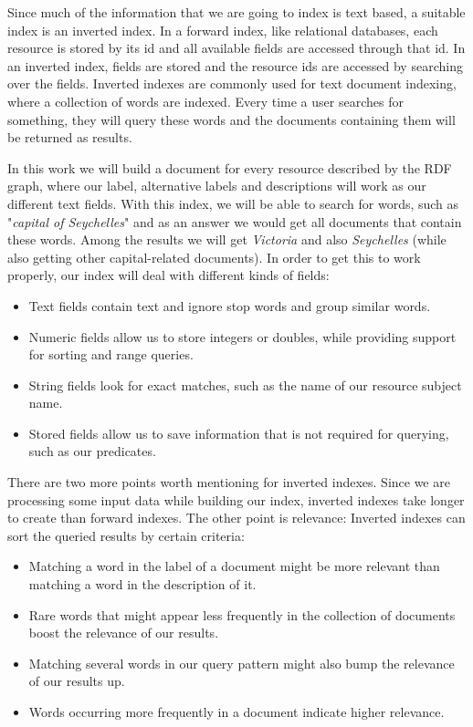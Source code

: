 Since much of the information that we are going to index is text based, a suitable index is an inverted index. In a forward index, like relational databases, each resource is stored by its id and all available fields are accessed through that id. In an inverted index, fields are stored and the resource ids are accessed by searching over the fields. Inverted indexes are commonly used for text document indexing, where a collection of words are indexed. Every time a user searches for something, they will query these words and the documents containing them will be returned as results.

In this work we will build a document for every resource described by the RDF graph, where our label, alternative labels and descriptions will work as our different text fields. With this index, we will be able to search for words, such as "\textit{capital of Seychelles}" and as an answer we would get all documents that contain these words. Among the results we will get \textit{Victoria} and also \textit{Seychelles} (while also getting other capital-related documents). In order to get this to work properly, our index will deal with different kinds of fields:

\begin{itemize}
    \item Text fields contain text and ignore stop words and group similar words.
    \item Numeric fields allow us to store integers or doubles, while providing support for sorting and range queries.
    \item String fields look for exact matches, such as the name of our resource subject name.
    \item Stored fields allow us to save information that is not required for querying, such as our predicates.
\end{itemize}

There are two more points worth mentioning for inverted indexes. Since we are processing some input data while building our index, inverted indexes take longer to create than forward indexes. The other point is relevance: Inverted indexes can sort the queried results by certain criteria: 

\begin{itemize}
    \item Matching a word in the label of a document might be more relevant than matching a word in the description of it.
    \item Rare words that might appear less frequently in the collection of documents boost the relevance of our results.
    \item Matching several words in our query pattern might also bump the relevance of our results up.
    \item Words occurring more frequently in a document indicate higher relevance.
\end{itemize}

